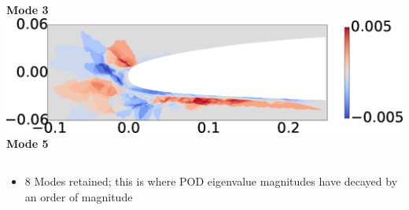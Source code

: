 \documentclass[9pt]{beamer}
\begin{document}
\begin{frame}
\begin{columns}[c]
    {\bf Mode 3} \\
    \includegraphics[width=1\textwidth]{MODE5.png} \\
    {\bf Mode 5}
\end{columns}


\begin{itemize}
\item 8 Modes retained; this is where POD eigenvalue magnitudes have
  decayed by an order of magnitude
\end{itemize}
\end{frame}
\end{document}
